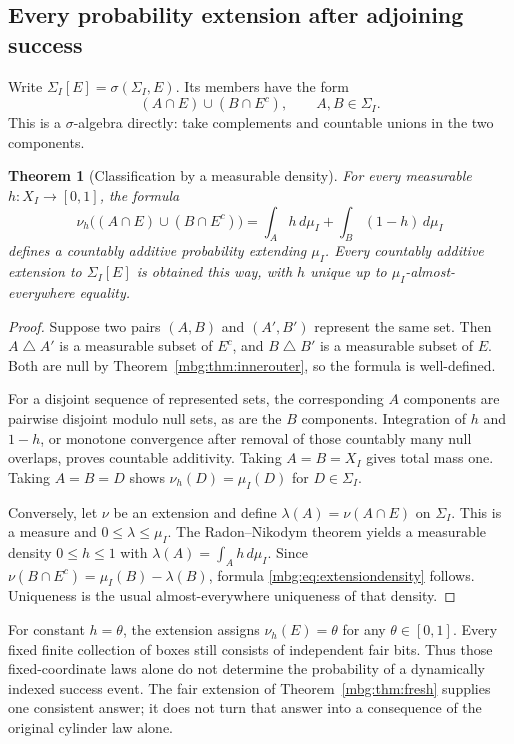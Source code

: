 \documentclass[11pt,letterpaper]{article}
\newtheorem{theorem}{Theorem}[section]
\theoremstyle{definition}
\newcommand{\Sig}{\Sigma}
\newcommand{\sg}{\sigma}
\begin{document}
\subsection{Every probability extension after adjoining success}

Write $\Sig_I[E]=\sg(\Sig_I,E)$. Its members have the form
\begin{equation}
 (A\cap E)\cup(B\cap E^c),\qquad A,B\in\Sig_I.
 \label{mbg:eq:adjoin}
\end{equation}
This is a $\sigma$-algebra directly: take complements and countable unions in the two components.

\begin{theorem}[Classification by a measurable density]
\label{mbg:thm:classification}
For every measurable $h:X_I\to[0,1]$, the formula
\begin{equation}
 \nu_h\big((A\cap E)\cup(B\cap E^c)\big)
   =\int_Ah\,d\mu_I+\int_B(1-h)\,d\mu_I
 \label{mbg:eq:extensiondensity}
\end{equation}
defines a countably additive probability extending $\mu_I$. Every countably additive extension to $\Sig_I[E]$ is obtained this way, with $h$ unique up to $\mu_I$-almost-everywhere equality.
\end{theorem}
\begin{proof}
Suppose two pairs $(A,B)$ and $(A',B')$ represent the same set. Then $A\mathbin\triangle A'$ is a measurable subset of $E^c$, and $B\mathbin\triangle B'$ is a measurable subset of $E$. Both are null by Theorem~\ref{mbg:thm:innerouter}, so the formula is well-defined.

For a disjoint sequence of represented sets, the corresponding $A$ components are pairwise disjoint modulo null sets, as are the $B$ components. Integration of $h$ and $1-h$, or monotone convergence after removal of those countably many null overlaps, proves countable additivity. Taking $A=B=X_I$ gives total mass one. Taking $A=B=D$ shows $\nu_h(D)=\mu_I(D)$ for $D\in\Sig_I$.

Conversely, let $\nu$ be an extension and define $\lambda(A)=\nu(A\cap E)$ on $\Sig_I$. This is a measure and $0\le\lambda\le\mu_I$. The Radon--Nikodym theorem yields a measurable density $0\le h\le1$ with $\lambda(A)=\int_Ah\,d\mu_I$. Since
$\nu(B\cap E^c)=\mu_I(B)-\lambda(B)$, formula \eqref{mbg:eq:extensiondensity} follows. Uniqueness is the usual almost-everywhere uniqueness of that density.
\end{proof}

For constant $h=\theta$, the extension assigns $\nu_h(E)=\theta$ for any $\theta\in[0,1]$. Every fixed finite collection of boxes still consists of independent fair bits. Thus those fixed-coordinate laws alone do not determine the probability of a dynamically indexed success event. The fair extension of Theorem~\ref{mbg:thm:fresh} supplies one consistent answer; it does not turn that answer into a consequence of the original cylinder law alone.
\end{document}
